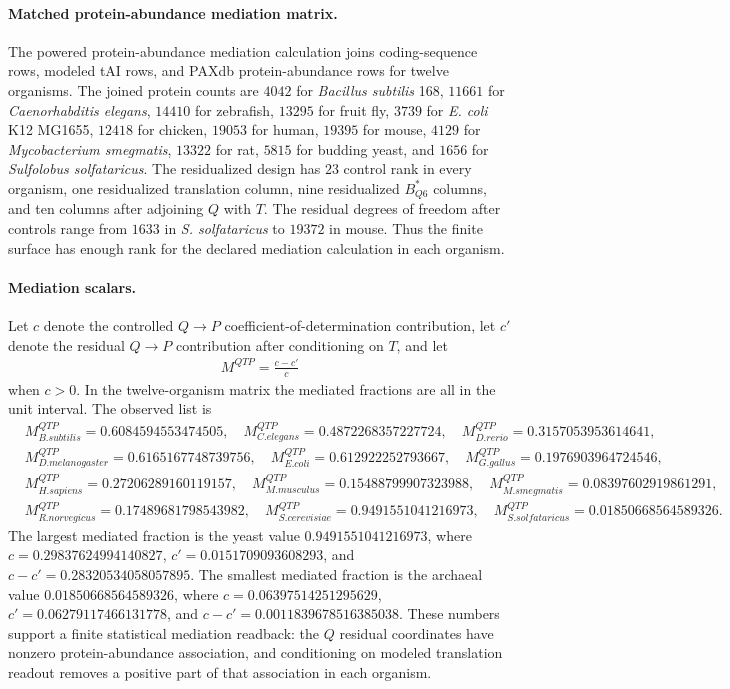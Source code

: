 \paragraph{Matched protein-abundance mediation matrix.}
The powered protein-abundance mediation calculation joins coding-sequence rows, modeled tAI rows, and PAXdb protein-abundance rows for twelve organisms.  The joined protein counts are $4042$ for \emph{Bacillus subtilis} 168, $11661$ for \emph{Caenorhabditis elegans}, $14410$ for zebrafish, $13295$ for fruit fly, $3739$ for \emph{E. coli} K12 MG1655, $12418$ for chicken, $19053$ for human, $19395$ for mouse, $4129$ for \emph{Mycobacterium smegmatis}, $13322$ for rat, $5815$ for budding yeast, and $1656$ for \emph{Sulfolobus solfataricus}.  The residualized design has $23$ control rank in every organism, one residualized translation column, nine residualized $B^{\ast}_{Q6}$ columns, and ten columns after adjoining $Q$ with $T$.  The residual degrees of freedom after controls range from $1633$ in \emph{S. solfataricus} to $19372$ in mouse.  Thus the finite surface has enough rank for the declared mediation calculation in each organism.

\paragraph{Mediation scalars.}
Let $c$ denote the controlled $Q \to P$ coefficient-of-determination contribution, let $c'$ denote the residual $Q \to P$ contribution after conditioning on $T$, and let
$$
\begin{aligned}
M^{QTP} = \frac{c-c'}{c}
\end{aligned}
$$
when $c>0$.  In the twelve-organism matrix the mediated fractions are all in the unit interval.  The observed list is
$$
\begin{aligned}
&M^{QTP}_{B.subtilis}=0.6084594553474505,\quad
M^{QTP}_{C.elegans}=0.4872268357227724,\quad
M^{QTP}_{D.rerio}=0.3157053953614641,\\
&M^{QTP}_{D.melanogaster}=0.6165167748739756,\quad
M^{QTP}_{E.coli}=0.612922252793667,\quad
M^{QTP}_{G.gallus}=0.1976903964724546,\\
&M^{QTP}_{H.sapiens}=0.27206289160119157,\quad
M^{QTP}_{M.musculus}=0.15488799907323988,\quad
M^{QTP}_{M.smegmatis}=0.08397602919861291,\\
&M^{QTP}_{R.norvegicus}=0.17489681798543982,\quad
M^{QTP}_{S.cerevisiae}=0.9491551041216973,\quad
M^{QTP}_{S.solfataricus}=0.01850668564589326.
\end{aligned}
$$
The largest mediated fraction is the yeast value $0.9491551041216973$, where $c=0.29837624994140827$, $c'=0.0151709093608293$, and $c-c'=0.28320534058057895$.  The smallest mediated fraction is the archaeal value $0.01850668564589326$, where $c=0.06397514251295629$, $c'=0.06279117466131778$, and $c-c'=0.0011839678516385038$.  These numbers support a finite statistical mediation readback: the $Q$ residual coordinates have nonzero protein-abundance association, and conditioning on modeled translation readout removes a positive part of that association in each organism.


